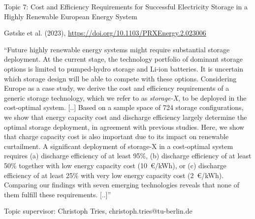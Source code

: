 \documentclass[10pt,aspectratio=169,dvipsnames]{beamer}
\begin{document}
\begin{frame}
  \begin{block}{Topic 7: Cost and Efficiency Requirements for Successful Electricity Storage in a Highly Renewable European Energy System}
      
    Gøtske et al. (2023), \href{https://doi.org/10.1103/PRXEnergy.2.023006}{https://doi.org/10.1103/PRXEnergy.2.023006}
    
    \enquote{Future highly renewable energy systems might require substantial storage deployment. At the current stage, the technology portfolio of dominant storage options is limited to pumped-hydro storage and Li-ion batteries. It is uncertain which storage design will be able to compete with these options. Considering Europe as a case study, we derive the cost and efficiency requirements of a generic storage technology, which we refer to as \emph{storage-X}, to be deployed in the cost-optimal system. [..] Based on a sample space of 724 storage configurations, we show that energy capacity cost and discharge efficiency largely determine the optimal storage deployment, in agreement with previous studies. Here, we show that charge capacity cost is also important due to its impact on renewable curtailment. A significant deployment of storage-X in a cost-optimal system requires (a) discharge efficiency of at least 95\%, (b) discharge efficiency of at least 50\% together with low energy capacity cost (10~€/kWh), or (c) discharge efficiency of at least 25\% with very low energy capacity cost (2~€/kWh). Comparing our findings with seven emerging technologies reveals that none of them fulfill these requirements.  [..]}

    \hfill
    Topic supervisor: Christoph Tries, christoph.tries@tu-berlin.de
    
  \end{block}
\end{frame}
\end{document}
